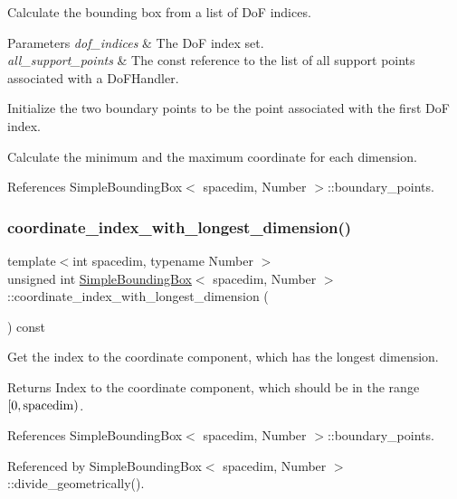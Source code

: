 Calculate the bounding box from a list of DoF indices. 
\begin{DoxyParams}{Parameters}
{\em dof\+\_\+indices} & The DoF index set. \\
\hline
{\em all\+\_\+support\+\_\+points} & The const reference to the list of all support points associated with a Do\+F\+Handler. \\
\hline
\end{DoxyParams}
Initialize the two boundary points to be the point associated with the first DoF index.

Calculate the minimum and the maximum coordinate for each dimension.

References Simple\+Bounding\+Box$<$ spacedim, Number $>$\+::boundary\+\_\+points.

\mbox{\label{classSimpleBoundingBox_abc665d7750573194c9c449ef67c40113}} 
\subsubsection{\texorpdfstring{coordinate\+\_\+index\+\_\+with\+\_\+longest\+\_\+dimension()}{coordinate\_index\_with\_longest\_dimension()}}
{\footnotesize\ttfamily template$<$int spacedim, typename Number $>$ \\
unsigned int \hyperlink{classSimpleBoundingBox}{Simple\+Bounding\+Box}$<$ spacedim, Number $>$\+::coordinate\+\_\+index\+\_\+with\+\_\+longest\+\_\+dimension (\begin{DoxyParamCaption}{ }\end{DoxyParamCaption}) const}

Get the index to the coordinate component, which has the longest dimension. \begin{DoxyReturn}{Returns}
Index to the coordinate component, which should be in the range $[0, {\rm spacedim})$. 
\end{DoxyReturn}


References Simple\+Bounding\+Box$<$ spacedim, Number $>$\+::boundary\+\_\+points.



Referenced by Simple\+Bounding\+Box$<$ spacedim, Number $>$\+::divide\+\_\+geometrically().

